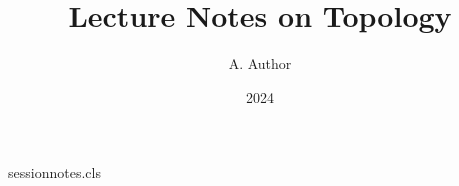 \begin{filecontents*}[overwrite]{sessionnotes.cls}
\newcommand\course[1]{\gdef\@course{#1}}
\renewcommand\maketitle{%
  \begin{center}
    {\LARGE \@title \par}
    {\large Course: \@course \par}
    \@tempcnta=\@date\relax
    {\large Exam session \the\@tempcnta \par}
  \end{center}\par}
\end{filecontents*}
\documentclass{sessionnotes}
\title{Lecture Notes on Topology}
\author{A. Author}
\date{2024}

\maketitle
Text.

